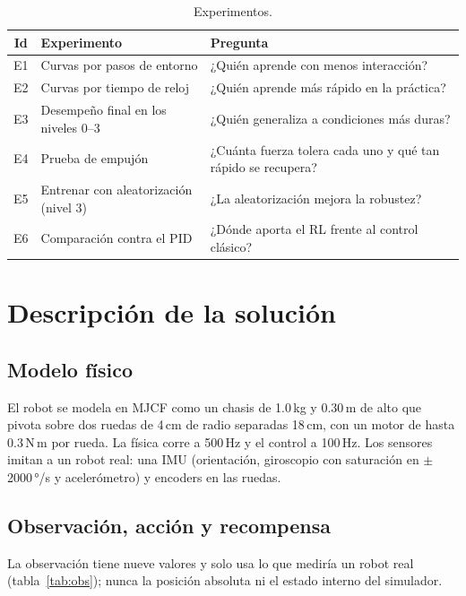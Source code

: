 \documentclass[11pt,a4paper]{article}
\newcommand{\SI}[2]{#1\,#2}  %
\begin{document}
\begin{table}[H]
\centering
\caption{Experimentos.}
\label{tab:experimentos}
\small
\begin{tabularx}{\textwidth}{@{}clY@{}}
\toprule
Id & Experimento & Pregunta \\
\midrule
E1 & Curvas por pasos de entorno & ¿Quién aprende con menos interacción? \\
E2 & Curvas por tiempo de reloj & ¿Quién aprende más rápido en la práctica? \\
E3 & Desempeño final en los niveles 0--3 & ¿Quién generaliza a condiciones más duras? \\
E4 & Prueba de empujón & ¿Cuánta fuerza tolera cada uno y qué tan rápido se recupera? \\
E5 & Entrenar con aleatorización (nivel 3) & ¿La aleatorización mejora la robustez? \\
E6 & Comparación contra el PID & ¿Dónde aporta el RL frente al control clásico? \\
\bottomrule
\end{tabularx}
\end{table}

\section{Descripción de la solución}

\subsection{Modelo físico}

El robot se modela en MJCF como un chasis de \SI{1.0}{kg} y \SI{0.30}{m} de alto que pivota sobre dos ruedas de \SI{4}{cm} de radio separadas \SI{18}{cm}, con un motor de hasta \SI{0.3}{N\,m} por rueda. La física corre a \SI{500}{Hz} y el control a \SI{100}{Hz}. Los sensores imitan a un robot real: una IMU (orientación, giroscopio con saturación en $\pm$\SI{2000}{°/s} y acelerómetro) y encoders en las ruedas.

\subsection{Observación, acción y recompensa}

La observación tiene nueve valores y solo usa lo que mediría un robot real (tabla~\ref{tab:obs}); nunca la posición absoluta ni el estado interno del simulador.
\end{document}
